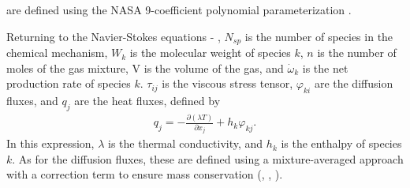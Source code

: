 are defined using the NASA 9-coefficient polynomial parameterization \cite{mcbride2002nasa}.

Returning to the Navier-Stokes equations  - , $N_{sp}$ is the number of species
in the chemical mechanism, $W_{k}$ is the molecular weight of species $k$, $n$ is the number of moles of the gas
mixture, V is the volume of the gas, and $\dot{\omega}_{k}$ is the net production rate of species $k$. $\tau_{ij}$
is the viscous stress tensor, $\varphi_{ki}$ are the diffusion fluxes, and $q_{j}$ are the heat fluxes, defined by
\begin{align}
q_{j} = - \frac{\partial (\lambda T)}{\partial x_{j}} + h_{k}\varphi_{kj}.
\end{align}
In this expression, $\lambda$ is the thermal conductivity, and $h_{k}$ is the enthalpy of species $k$.
As for the diffusion fluxes, these are defined using a mixture-averaged approach with a
correction term to ensure mass conservation (\cite{smooke2013computation}, \cite{poinsot2005theoretical}, \cite{kee2005chemically}).

